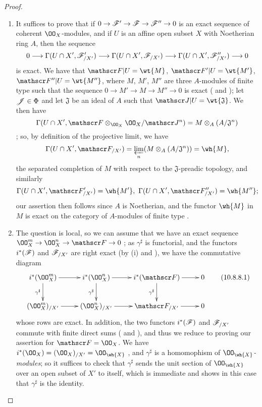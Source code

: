 \begin{proof}
\label{proof-1.10.8.8}
\medskip\noindent
\begin{enumerate}[label=(\roman*)]
  \item It suffices to prove that if $0\to\sh{F}'\to\sh{F}\to\sh{F}''\to 0$ is an exact sequence of coherent $\OO_X$-modules, and if $U$ is an affine open subset $X$ with Noetherian ring $A$, then the sequence
\[
  0\to\Gamma(U\cap X',\sh{F}_{/X'}')\to\Gamma(U\cap X',\sh{F}_{/X'})\to\Gamma(U\cap X',\sh{F}_{/X'}'')\to 0
\]
is exact.
We have that $\sh{F}|U=\wt{M}$, $\sh{F}'|U=\wt{M'}$, $\sh{F}''|U=\wt{M''}$, where $M$, $M'$, $M''$ are three $A$-modules of finite type such that the sequence $0\to M'\to M\to M''\to 0$ is exact ( and ); let $\mathscr{J}\in\Phi$ and let $\mathfrak{J}$ be an ideal of $A$ such that $\sh{J}|U=\wt{\mathfrak{J}}$.
We then have
\[
  \Gamma(U\cap X',\sh{F}\otimes_{\OO_X}\OO_X/\sh{J}^n)=M\otimes_A(A/\mathfrak{J}^n)
\]
; so, by definition of the projective limit, we have
\[
  \Gamma(U\cap X',\sh{F}_{/X'})=\varprojlim_n(M\otimes_A(A/\mathfrak{J}^n))=\wh{M},
\]
the separated completion of $M$ with respect to the $\mathfrak{J}$-preadic topology, and similarly
\[
  \Gamma(U\cap X',\sh{F}_{/X'}')=\wh{M'},\ \Gamma(U\cap X',\sh{F}_{/X'}'')=\wh{M''};
\]
our assertion then follows since $A$ is Noetherian, and the functor $\wh{M}$ in $M$ is exact on the category of $A$-modules of finite type .
  \item The question is local, so we can assume that we have an exact sequence $\OO_X^m\to\OO_X^n\to\sh{F}\to 0$ ; as $\gamma^\sharp$ is functorial, and the functors $i^*(\mathscr{F})$ and $\mathscr{F}_{/X'}$ are right exact (by (i) and ), we have the commutative diagram
\[
  \xymatrix{
    i^*(\OO_X^m)\ar[r]\ar[d]_{\gamma^\sharp} &
    i^*(\OO_X^n)\ar[r]\ar[d]_{\gamma^\sharp} &
    i^*(\sh{F})\ar[r]\ar[d]_{\gamma^\sharp} &
    0\\
    (\OO_X^m)_{/X'}\ar[r] &
    (\OO_X^n)_{/X'}\ar[r] &
    \sh{F}_{/X'}\ar[r] &
    0
  }
  \tag{10.8.8.1}
\]
whose rows are exact.
In addition, the two functors $i^*(\mathscr{F})$ and $\mathscr{F}_{/X'}$ commute with finite direct sums ( and ), and thus we reduce to proving our assertion for $\sh{F}=\OO_X$.
We have $i^*(\OO_X)=(\OO_X)_{/X'}=\OO_\wh{X}$ , and $\gamma^\sharp$ is a homomophism of \emph{$\OO_\wh{X}$-modules}; so it suffices to check that $\gamma^\sharp$ sends the unit section of $\OO_\wh{X}$ over an open subset of $X'$ to itself, which is immediate and shows in this case that $\gamma^\sharp$ is the identity.
\end{enumerate}
\end{proof}


